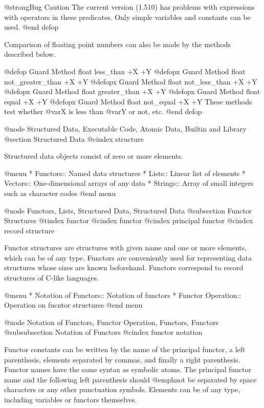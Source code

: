 {{@strong{Bug Caution} The current version (1.510) has problems with
expressions with operators in these predicates.  Only simple variables
and constants can be used.
@end defop

Comparison of floating point numbers can also be made by the methods
described below.

@defop {Guard Method} float less_than +X +Y
@defopx {Guard Method} float not_greater_than +X +Y
@defopx {Guard Method} float not_less_than +X +Y
@defopx {Guard Method} float greater_than +X +Y
@defopx {Guard Method} float equal +X +Y
@defopx {Guard Method} float not_equal +X +Y
These methods test whether @var{X} is less than @var{Y} or not, etc.
@end defop

@node Structured Data, Executable Code, Atomic Data, Builtin and Library
@section Structured Data
@cindex structure

Structured data objects consist of zero or more elements.

@menu
* Functors::                    Named data structures
* Lists::                       Linear list of elements
* Vectors::                     One-dimensional arrays of any data
* Strings::                     Array of small integers such as character codes
@end menu

@node Functors, Lists, Structured Data, Structured Data
@subsection Functor Structures
@tindex functor
@cindex functor
@cindex principal functor
@cindex record structure

Functor structures are structures with given name and one or more
elements, which can be of any type.  Functors are conveniently used for
representing data structures whose sizes are known beforehand.  Functors
correspond to record structures of C-like languages.

@menu
* Notation of Functors::        Notation of functors
* Functor Operation::           Operation on fucntor structures
@end menu

@node Notation of Functors, Functor Operation, Functors, Functors
@subsubsection Notation of Functors
@cindex functor notation

Functor constants can be written by the name of the principal functor, a
left parenthesis, elements separated by commas, and finally a right
parenthesis.  Functor names have the same syntax as symbolic atoms.  The
principal functor name and the following left parenthesis should
@emph{not} be separated by space characters or any other punctuation
symbols.  Elements can be of any type, including variables or functors
themselves.

}}
